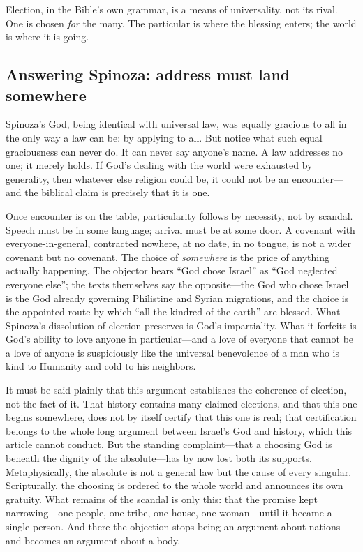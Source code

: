 Election, in the Bible's own grammar, is a means of universality, not its rival. One is chosen \emph{for} the many. The particular is where the blessing enters; the world is where it is going.

\subsection{Answering Spinoza: address must land somewhere}

Spinoza's God, being identical with universal law, was equally gracious to all in the only way a law can be: by applying to all. But notice what such equal graciousness can never do. It can never say anyone's name. A law addresses no one; it merely holds. If God's dealing with the world were exhausted by generality, then whatever else religion could be, it could not be an encounter---and the biblical claim is precisely that it is one.

Once encounter is on the table, particularity follows by necessity, not by scandal. Speech must be in some language; arrival must be at some door. A covenant with everyone-in-general, contracted nowhere, at no date, in no tongue, is not a wider covenant but no covenant. The choice of \emph{somewhere} is the price of anything actually happening. The objector hears ``God chose Israel'' as ``God neglected everyone else''; the texts themselves say the opposite---the God who chose Israel is the God already governing Philistine and Syrian migrations, and the choice is the appointed route by which ``all the kindred of the earth'' are blessed. What Spinoza's dissolution of election preserves is God's impartiality. What it forfeits is God's ability to love anyone in particular---and a love of everyone that cannot be a love of anyone is suspiciously like the universal benevolence of a man who is kind to Humanity and cold to his neighbors.

It must be said plainly that this argument establishes the coherence of election, not the fact of it. That history contains many claimed elections, and that this one begins somewhere, does not by itself certify that this one is real; that certification belongs to the whole long argument between Israel's God and history, which this article cannot conduct. But the standing complaint---that a choosing God is beneath the dignity of the absolute---has by now lost both its supports. Metaphysically, the absolute is not a general law but the cause of every singular. Scripturally, the choosing is ordered to the whole world and announces its own gratuity. What remains of the scandal is only this: that the promise kept narrowing---one people, one tribe, one house, one woman---until it became a single person. And there the objection stops being an argument about nations and becomes an argument about a body.

